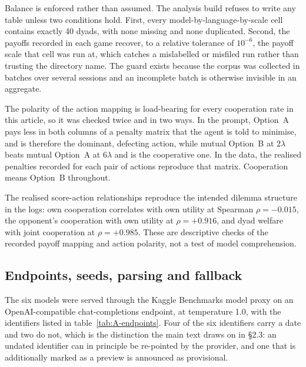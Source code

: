 \documentclass[11pt,a4paper]{article}
\newcommand{\lam}{\lambda}
\begin{document}
Balance is enforced rather than assumed. The analysis build refuses to write any table unless two conditions hold. First, every model-by-language-by-scale cell contains exactly 40 dyads, with none missing and none duplicated. Second, the payoffs recorded in each game recover, to a relative tolerance of $10^{-6}$, the payoff scale that cell was run at, which catches a mislabelled or misfiled run rather than trusting the directory name. The guard exists because the corpus was collected in batches over several sessions and an incomplete batch is otherwise invisible in an aggregate.

The polarity of the action mapping is load-bearing for every cooperation rate in this article, so it was checked twice and in two ways. In the prompt, Option~A pays less in both columns of a penalty matrix that the agent is told to minimise, and is therefore the dominant, defecting action, while mutual Option~B at $2\lam$ beats mutual Option~A at $6\lam$ and is the cooperative one. In the data, the realised penalties recorded for each pair of actions reproduce that matrix. Cooperation means Option~B throughout.

The realised score-action relationships reproduce the intended dilemma structure in the logs: own cooperation correlates with own utility at Spearman $\rho = -0.015$, the opponent's cooperation with own utility at $\rho = +0.916$, and dyad welfare with joint cooperation at $\rho = +0.985$. These are descriptive checks of the recorded payoff mapping and action polarity, not a test of model comprehension.

\subsection{Endpoints, seeds, parsing and fallback}\label{appendix:endpoints}

The six models were served through the Kaggle Benchmarks model proxy on an OpenAI-compatible chat-completions endpoint, at temperature 1.0, with the identifiers listed in table~\ref{tab:A-endpoints}. Four of the six identifiers carry a date and two do not, which is the distinction the main text draws on in \S2.3: an undated identifier can in principle be re-pointed by the provider, and one that is additionally marked as a preview is announced as provisional.
\end{document}
